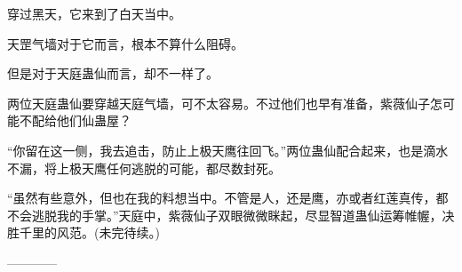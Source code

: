 \begin{this_body}
穿过黑天，它来到了白天当中。

天罡气墙对于它而言，根本不算什么阻碍。

但是对于天庭蛊仙而言，却不一样了。

两位天庭蛊仙要穿越天庭气墙，可不太容易。不过他们也早有准备，紫薇仙子怎可能不配给他们仙蛊屋？

“你留在这一侧，我去追击，防止上极天鹰往回飞。”两位蛊仙配合起来，也是滴水不漏，将上极天鹰任何逃脱的可能，都尽数封死。

“虽然有些意外，但也在我的料想当中。不管是人，还是鹰，亦或者红莲真传，都不会逃脱我的手掌。”天庭中，紫薇仙子双眼微微眯起，尽显智道蛊仙运筹帷幄，决胜千里的风范。(未完待续。)

------------

\end{this_body}

